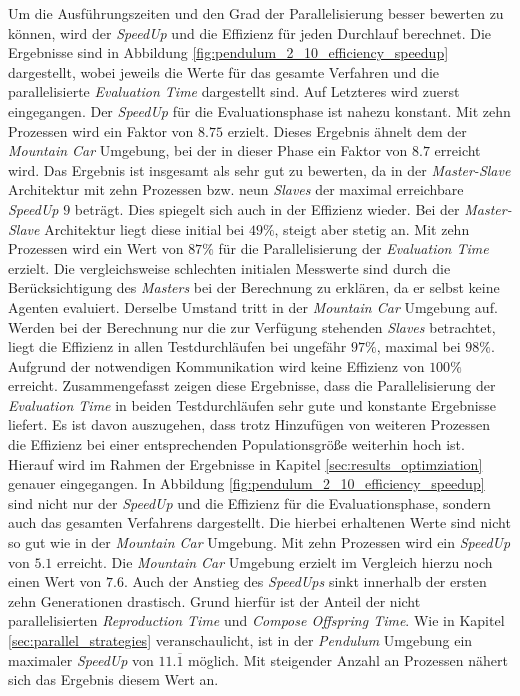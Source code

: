 Um die Ausführungszeiten und den Grad der Parallelisierung besser bewerten zu können, wird der \emph{SpeedUp} und die Effizienz für jeden Durchlauf berechnet. Die Ergebnisse sind in Abbildung \ref{fig:pendulum_2_10_efficiency_speedup} dargestellt, wobei jeweils die Werte für das gesamte Verfahren und die parallelisierte \emph{Evaluation Time} dargestellt sind. Auf Letzteres wird zuerst eingegangen. Der \emph{SpeedUp} für die Evaluationsphase ist nahezu konstant. Mit zehn Prozessen wird ein Faktor von $8.75$ erzielt. Dieses Ergebnis ähnelt dem der \emph{Mountain Car} Umgebung, bei der in dieser Phase ein Faktor von $8.7$ erreicht wird. Das Ergebnis ist insgesamt als sehr gut zu bewerten, da in der \emph{Master-Slave} Architektur mit zehn Prozessen bzw. neun \emph{Slaves} der maximal erreichbare \emph{SpeedUp} $9$ beträgt. Dies spiegelt sich auch in der Effizienz wieder. Bei der \emph{Master-Slave} Architektur liegt diese initial bei $49\%$, steigt aber stetig an. Mit zehn Prozessen wird ein Wert von $87\%$ für die Parallelisierung der \emph{Evaluation Time} erzielt. Die vergleichsweise schlechten initialen Messwerte sind durch die Berücksichtigung des \emph{Masters} bei der Berechnung zu erklären, da er selbst keine Agenten evaluiert. Derselbe Umstand tritt in der \emph{Mountain Car} Umgebung auf. Werden bei der Berechnung nur die zur Verfügung stehenden \emph{Slaves} betrachtet, liegt die Effizienz in allen Testdurchläufen bei ungefähr $97\%$, maximal bei $98\%$. Aufgrund der notwendigen Kommunikation wird keine Effizienz von $100\%$ erreicht. Zusammengefasst zeigen diese Ergebnisse, dass die Parallelisierung der \emph{Evaluation Time} in beiden Testdurchläufen sehr gute und konstante Ergebnisse liefert. Es ist davon auszugehen, dass trotz Hinzufügen von weiteren Prozessen die Effizienz bei einer entsprechenden Populationsgröße weiterhin hoch ist. Hierauf wird im Rahmen der Ergebnisse in Kapitel \ref{sec:results_optimziation} genauer eingegangen. In Abbildung \ref{fig:pendulum_2_10_efficiency_speedup} sind nicht nur der \emph{SpeedUp} und die Effizienz für die Evaluationsphase, sondern auch das gesamten Verfahrens dargestellt. Die hierbei erhaltenen Werte sind nicht so gut wie in der \emph{Mountain Car} Umgebung. Mit zehn Prozessen wird ein \emph{SpeedUp} von $5.1$ erreicht. Die \emph{Mountain Car} Umgebung erzielt im Vergleich hierzu noch einen Wert von $7.6$. Auch der Anstieg des \emph{SpeedUps} sinkt innerhalb der ersten zehn Generationen drastisch. Grund hierfür ist der Anteil der nicht parallelisierten \emph{Reproduction Time} und \emph{Compose Offspring Time}. Wie in Kapitel \ref{sec:parallel_strategies} veranschaulicht, ist in der \emph{Pendulum} Umgebung ein maximaler \emph{SpeedUp} von $11.\overline{1}$ möglich. Mit steigender Anzahl an Prozessen nähert sich das Ergebnis diesem Wert an.
